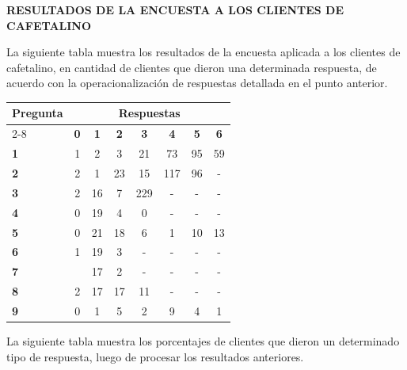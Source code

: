 \textbf{RESULTADOS DE LA ENCUESTA A LOS CLIENTES DE CAFETALINO}

La siguiente tabla muestra los resultados de la encuesta aplicada a los clientes de cafetalino, en cantidad de clientes que dieron una determinada respuesta, de acuerdo con la operacionalización de respuestas detallada en el punto anterior.

\label{tab:resultados-de-la-encuesta-aplicada}

\begin{center}
\begin{tabular}{@{}l*{7}{c}@{}}
\toprule
\multirow{2}{*}{\textbf{Pregunta}} & \multicolumn{7}{c}{\textbf{Respuestas}} \\
\cmidrule(l){2-8}
 & \textbf{0} & \textbf{1} & \textbf{2} & \textbf{3} & \textbf{4} & \textbf{5} & \textbf{6} \\
\midrule
\textbf{1} & 1 & 2 & 3 & 21 & 73 & 95 & 59 \\
\textbf{2} & 2 & 1 & 23 & 15 & 117 & 96 & - \\
\textbf{3} & 2 & 16 & 7 & 229 & - & - & - \\
\textbf{4} & 0 & 19 & 4 & 0 & - & - & - \\
\textbf{5} & 0 & 21 & 18 & 6 & 1 & 10 & 13 \\
\textbf{6} & 1 & 19 & 3 & - & - & - & - \\
\textbf{7} & & 17 & 2 & - & - & - & - \\
\textbf{8} & 2 & 17 & 17 & 11 & - & - & - \\
\textbf{9} & 0 & 1 & 5 & 2 & 9 & 4 & 1 \\
\bottomrule
\end{tabular}
\end{center}


La siguiente tabla muestra los porcentajes de clientes que dieron un determinado tipo de respuesta, luego de procesar los resultados anteriores.

\label{tab:resultados-de-la-encuesta-aplicada-2}

